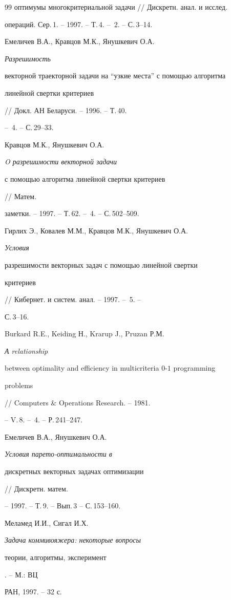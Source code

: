 \begin{thebibliography}{99}
{оптимумы многокритериальной задачи} // Дискретн. анал. и исслед. 


операций. Сер.\,1. -- 1997. -- Т.\,4. -- \No\,2. -- С.\,3--14. 




Емеличев В.А., Кравцов М.К., Янушкевич О.А. {\em Разрешимость 


векторной траекторной задачи на ``узкие места'' с помощью алгоритма 


линейной свертки критериев} // Докл. АН Беларуси. -- 1996. -- Т.\,40. 


-- \No\,4. -- С.\,29--33. 




Кравцов М.К., Янушкевич О.А. {\em O разрешимости векторной задачи 


с помощью алгоритма линейной свертки критериев} // Матем. 


заметки. -- 1997. -- Т.\,62. -- \No\,4. -- С.\,502--509. 




Гирлих Э., Ковалев М.М., Кравцов М.К., Янушкевич О.А. {\em Условия 


разрешимости векторных задач с помощью линейной свертки 


критериев} // Кибернет. и систем. анал. -- 1997. -- \No\,5. -- 


С.\,3--16. 




Burkard R.E., Keiding Н., Krarup J., Pruzan Р.М. {\em А relationship 


between optimality and efficiency in multicriteria $0$-$1$ programming 


problems}// Computers $\&$ Operations Research. -- 1981. 


-- V.\,8. -- \No\,4. -- Р.\,241--247. 




Емеличев В.А., Янушкевич О.А. {\em Условия парето-оптимальности в 


дискретных векторных задачах оптимизации} // Дискретн. матем. 


-- 1997. -- Т.\,9. -- Вып.\,3 -- С.\,153--160. 




Меламед И.И., Сигал И.Х. {\em Задача коммивояжера: некоторые вопросы 


теории, алгоритмы, эксперимент}. -- М.: ВЦ  


РАН, 1997. -- 32 с. 


 


\end{thebibliography} 


